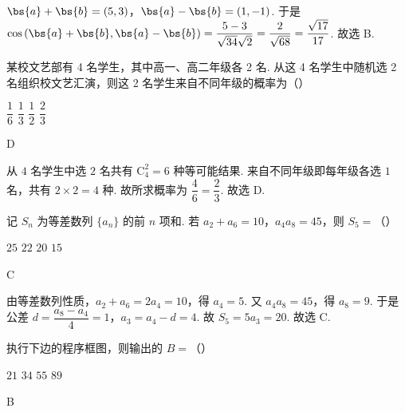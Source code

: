 \begin{solution}
\(\bs{a}+\bs{b}=(5,3)\)，\(\bs{a}-\bs{b}=(1,-1)\). 于是 \(\cos\left(\bs{a}+\bs{b},\bs{a}-\bs{b}\right)=\dfrac{5-3}{\sqrt{34}\sqrt2}=\dfrac{2}{\sqrt{68}}=\dfrac{\sqrt{17}}{17}\). 故选 B.
\end{solution}

\begin{problem}
某校文艺部有 4 名学生，其中高一、高二年级各 2 名. 从这 4 名学生中随机选 2 名组织校文艺汇演，则这 2 名学生来自不同年级的概率为（\quad）

\choices
    {\(\dfrac{1}{6}\)}
    {\(\dfrac{1}{3}\)}
    {\(\dfrac{1}{2}\)}
    {\(\dfrac{2}{3}\)}
\end{problem}

\begin{answer}
D
\end{answer}

\begin{solution}
从 \(4\) 名学生中选 \(2\) 名共有 \(\mathrm C_4^2=6\) 种等可能结果. 来自不同年级即每年级各选 \(1\) 名，共有 \(2\times2=4\) 种. 故所求概率为 \(\dfrac46=\dfrac23\). 故选 D.
\end{solution}

\begin{problem}
记 \(S_n\) 为等差数列 \(\{a_n\}\) 的前 \(n\) 项和. 若 \(a_2+a_6=10\)，\(a_4a_8=45\)，则 \(S_5=\)（\quad）

\choices
    {\(25\)}
    {\(22\)}
    {\(20\)}
    {\(15\)}
\end{problem}

\begin{answer}
C
\end{answer}

\begin{solution}
由等差数列性质，\(a_2+a_6=2a_4=10\)，得 \(a_4=5\). 又 \(a_4a_8=45\)，得 \(a_8=9\). 于是公差 \(d=\dfrac{a_8-a_4}{4}=1\)，\(a_3=a_4-d=4\). 故 \(S_5=5a_3=20\). 故选 C.
\end{solution}

\begin{problem}
执行下边的程序框图，则输出的 \(B=\)（\quad）


\choices
    {\(21\)}
    {\(34\)}
    {\(55\)}
    {\(89\)}
\end{problem}

\begin{answer}
B
\end{answer}

